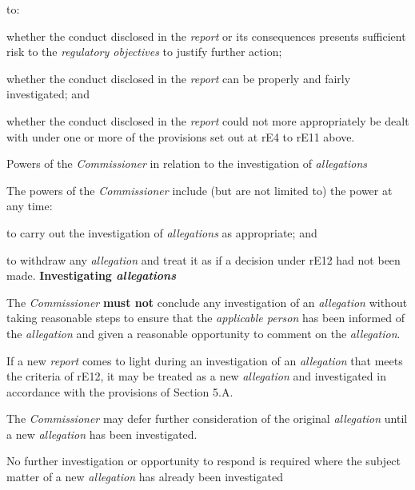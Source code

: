 to:\\\nl \item whether the conduct disclosed in the \emph{report} or its
consequences presents sufficient risk to the \emph{regulatory
objectives} to justify further action;
\item whether the conduct disclosed in the \emph{report} can be properly
and fairly investigated; and
\item whether the conduct disclosed in the \emph{report} could not more
appropriately be dealt with under one or more of the provisions set out
at rE4 to rE11 above.\ln
{}\par
Powers of the \emph{Commissioner} in relation to the investigation
of \emph{allegations}\par
{}\par
The powers of the \emph{Commissioner} include (but are not limited to)
the power at any time:\\\nl \item to carry out the investigation of \emph{allegations} as appropriate;
and\item to withdraw any \emph{allegation} and treat it as if a decision under
rE12 had not been made.\ln
\textbf{Investigating \emph{allegations}}\par
{}\par
The \emph{Commissioner}  \textcolor{myred}{\textbf{must not}} conclude any investigation of
an \emph{allegation} without taking reasonable steps to ensure that
the \emph{applicable person} has been informed of
the \emph{allegation} and given a reasonable opportunity to comment on
the \emph{allegation}.\\
\par
If a new \emph{report} comes to light during an investigation of
an \emph{allegation} that meets the criteria of rE12, it may be treated
as a new \emph{allegation} and investigated in accordance with the
provisions of Section 5.A.\\
\par
The \emph{Commissioner} may defer further consideration of the
original \emph{allegation} until a new \emph{allegation} has been
investigated.\\
\par
No further investigation or opportunity to respond is required where the
subject matter of a new \emph{allegation} has already been investigated
